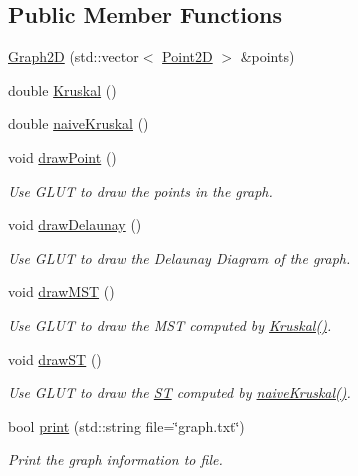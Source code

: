 \subsection*{Public Member Functions}
\begin{DoxyCompactItemize}
\item 
\hyperlink{classcmst_1_1_graph2_d_a36cf583f9e2e59da2bed94c8569914d2}{Graph2D} (std\+::vector$<$ \hyperlink{classcmst_1_1_point2_d}{Point2D} $>$ \&points)
\item 
double \hyperlink{classcmst_1_1_graph2_d_a034d2d37b2d106c0e25d7ad7bc67907e}{Kruskal} ()
\item 
double \hyperlink{classcmst_1_1_graph2_d_af0db14845e80799be1d4fb15ca230110}{naive\+Kruskal} ()
\item 
void \hyperlink{classcmst_1_1_graph2_d_affec250ee22a067a28127b46ce976b90}{draw\+Point} ()
\begin{DoxyCompactList}\small\item\em Use G\+L\+UT to draw the points in the graph. \end{DoxyCompactList}\item 
void \hyperlink{classcmst_1_1_graph2_d_a2c4ed2ccd1fffc94c636929e531c4e3e}{draw\+Delaunay} ()
\begin{DoxyCompactList}\small\item\em Use G\+L\+UT to draw the Delaunay Diagram of the graph. \end{DoxyCompactList}\item 
void \hyperlink{classcmst_1_1_graph2_d_a96e388b819b351c8564eed9aecf58f7d}{draw\+M\+ST} ()
\begin{DoxyCompactList}\small\item\em Use G\+L\+UT to draw the M\+ST computed by \hyperlink{classcmst_1_1_graph2_d_a034d2d37b2d106c0e25d7ad7bc67907e}{Kruskal()}. \end{DoxyCompactList}\item 
void \hyperlink{classcmst_1_1_graph2_d_aebccee0b43539e658029a6f531ee1b0e}{draw\+ST} ()
\begin{DoxyCompactList}\small\item\em Use G\+L\+UT to draw the \hyperlink{structcmst_1_1_graph2_d_1_1_s_t}{ST} computed by \hyperlink{classcmst_1_1_graph2_d_af0db14845e80799be1d4fb15ca230110}{naive\+Kruskal()}. \end{DoxyCompactList}\item 
bool \hyperlink{classcmst_1_1_graph2_d_a0e0bafdd08a942ef01c66768b5021f09}{print} (std\+::string file=\char`\"{}graph.\+txt\char`\"{})
\begin{DoxyCompactList}\small\item\em Print the graph information to file. \end{DoxyCompactList}\item 

\end{DoxyCompactItemize}
